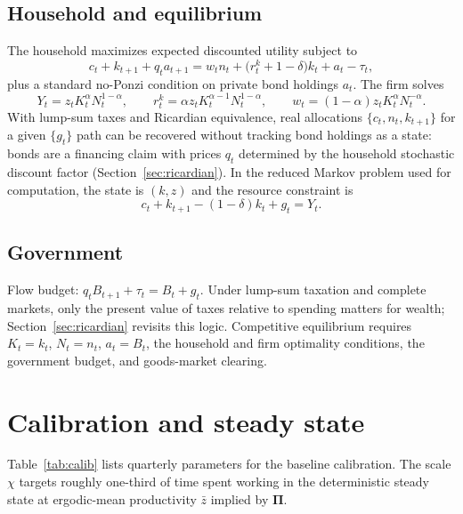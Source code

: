 \documentclass[11pt,a4paper]{article}
\begin{document}
\subsection{Household and equilibrium}
The household maximizes expected discounted utility subject to
\begin{equation}
  c_t + k_{t+1} + q_t a_{t+1}
  =
  w_t n_t + \bigl(r^k_t + 1 - \delta\bigr)k_t + a_t - \tau_t,
\end{equation}
plus a standard no-Ponzi condition on private bond holdings $a_t$. The firm solves
\begin{equation}
  Y_t = z_t K_t^\alpha N_t^{1-\alpha},
  \qquad
  r^k_t = \alpha z_t K_t^{\alpha-1}N_t^{1-\alpha},
  \qquad
  w_t = (1-\alpha)z_t K_t^\alpha N_t^{-\alpha}.
\end{equation}
With lump-sum taxes and Ricardian equivalence, real allocations $\{c_t,n_t,k_{t+1}\}$ for a given $\{g_t\}$ path can be recovered without tracking bond holdings as a state: bonds are a financing claim with prices $q_t$ determined by the household stochastic discount factor (Section~\ref{sec:ricardian}). In the reduced Markov problem used for computation, the state is $(k,z)$ and the resource constraint is
\begin{equation}
  c_t + k_{t+1} - (1-\delta)k_t + g_t = Y_t.
\end{equation}

\subsection{Government}
Flow budget: $q_t B_{t+1}+\tau_t=B_t+g_t$. Under lump-sum taxation and complete markets, only the present value of taxes relative to spending matters for wealth; Section~\ref{sec:ricardian} revisits this logic. Competitive equilibrium requires $K_t=k_t$, $N_t=n_t$, $a_t=B_t$, the household and firm optimality conditions, the government budget, and goods-market clearing.

\section{Calibration and steady state}

Table~\ref{tab:calib} lists quarterly parameters for the baseline calibration. The scale $\chi$ targets roughly one-third of time spent working in the deterministic steady state at ergodic-mean productivity $\bar z$ implied by $\bm{\Pi}$.
\end{document}
